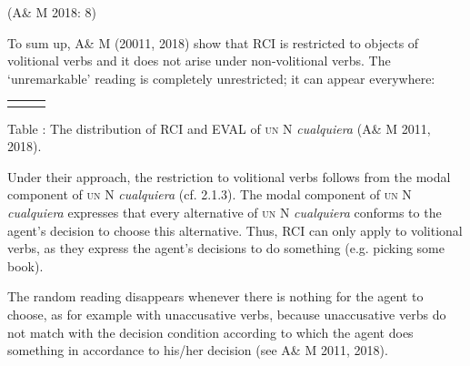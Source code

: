 \documentclass[output=paper]{langscibook}
\begin{document}
(A\& M 2018: 8)

To sum up, A\& M (20011, 2018) show that RCI is restricted to objects of volitional verbs and it does not arise under non-volitional verbs. The ‘unremarkable’ reading is completely unrestricted; it can appear everywhere:

\tabletail{}
\tablelasttail{}
\begin{tabularx}{\textwidth}{XXX}
\lspbottomrule
\end{tabularx}
\lsptoprule

\begin{styletablecaption}
Table : The distribution of RCI and EVAL of \textsc{un} N \textit{cualquiera} (A\& M 2011, 2018).
\end{styletablecaption}

Under their approach, the restriction to volitional verbs follows from the modal component of \textsc{un} N \textit{cualquiera} (cf. 2.1.3). The modal component of \textsc{un} N \textit{cualquiera} expresses that every alternative of \textsc{un} N \textit{cualquiera} conforms to the agent’s decision to choose this alternative. Thus, RCI can only apply to volitional verbs, as they express the agent’s decisions to do something (e.g. picking some book).

  The random reading disappears whenever there is nothing for the agent to choose, as for example with unaccusative verbs, because unaccusative verbs do not match with the decision condition according to which the agent does something in accordance to his/her decision (see A\& M 2011, 2018).
\end{document}
